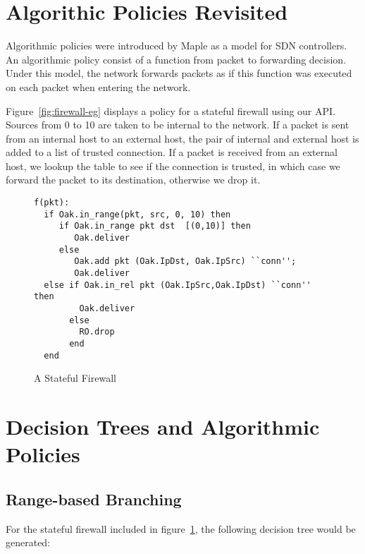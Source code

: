 \documentclass[preprint]{sigplanconf}
\begin{document}
\section*{Algorithic Policies Revisited}
Algorithmic policies were introduced by Maple as a model for SDN controllers. An algorithmic policy consist of a function from packet to forwarding decision. Under this model, the network forwards packets as if this function was executed on each packet when entering the network. 


Figure~\ref{fig:firewall-eg} displays a policy for a stateful firewall using our API. Sources from 0 to 10 are taken to be internal to the network. If a packet is sent from an internal host to an external host, the pair of internal and external host is added to a list of trusted connection. If a packet is received from an external host, we lookup the table to see if the connection is trusted, in which case we forward the packet to its destination, otherwise we drop it.


\begin{figure}[ht]
\begin{lstlisting}
f(pkt):
  if Oak.in_range(pkt, src, 0, 10) then
     if Oak.in_range pkt dst  [(0,10)] then
        Oak.deliver
     else 
        Oak.add pkt (Oak.IpDst, Oak.IpSrc) ``conn'';
        Oak.deliver
  else if Oak.in_rel pkt (Oak.IpSrc,Oak.IpDst) ``conn'' then
         Oak.deliver
       else
         RO.drop
       end
  end                
  \end{lstlisting}

\caption{A Stateful Firewall}
\label{fig:firewallcode}
\end{figure}




\section*{Decision Trees and Algorithmic Policies}
   \subsection*{Range-based Branching}


   
   

  For the stateful firewall included in figure~\ref{fig:firewallcode}, the following decision tree would be generated:
\end{document}

